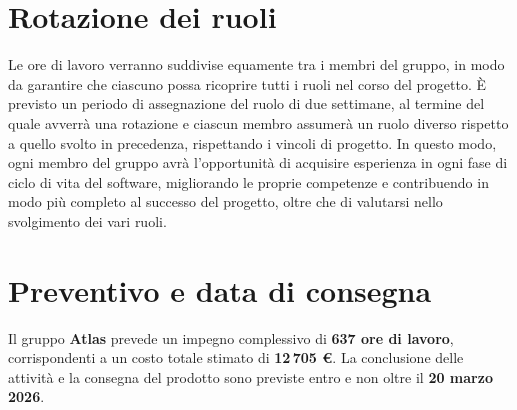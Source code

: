 \documentclass[a4paper,12pt]{article}
\begin{document}
\section{Rotazione dei ruoli}
    Le ore di lavoro verranno suddivise equamente tra i membri del gruppo, in modo da garantire che ciascuno possa ricoprire tutti i ruoli nel corso del progetto. È previsto un periodo di assegnazione del ruolo di due settimane, al termine del quale avverrà una rotazione e ciascun membro assumerà un ruolo diverso rispetto a quello svolto in precedenza, rispettando i vincoli di progetto. In questo modo, ogni membro del gruppo avrà l'opportunità di acquisire esperienza in ogni fase di ciclo di vita del software, migliorando le proprie competenze e contribuendo in modo più completo al successo del progetto, oltre che di valutarsi nello svolgimento dei vari ruoli.



\section{Preventivo e data di consegna}
Il gruppo \textbf{Atlas} prevede un impegno complessivo di \textbf{637 ore di lavoro}, corrispondenti a un costo totale stimato di \textbf{12\,705 €}.  
La conclusione delle attività e la consegna del prodotto sono previste entro e non oltre il \textbf{20 marzo 2026}.
 
\end{document}
